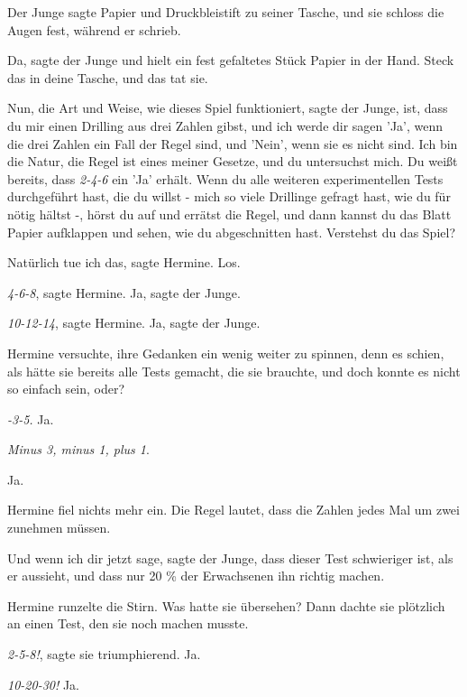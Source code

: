 Der Junge sagte \glqq Papier\grqq{} und \glqq Druckbleistift\grqq{} zu seiner
Tasche, und sie schloss die Augen fest, während er schrieb.

\glqq Da\grqq{}, sagte der Junge und hielt ein fest gefaltetes Stück Papier in
der Hand. \glqq Steck das in deine Tasche\grqq{}, und das tat sie.

\glqq Nun, die Art und Weise, wie dieses Spiel funktioniert\grqq{}, sagte der
Junge, \glqq ist, dass du mir einen Drilling aus drei Zahlen gibst, und ich
werde dir sagen 'Ja', wenn die drei Zahlen ein Fall der Regel sind, und 'Nein',
wenn sie es nicht sind. Ich bin die Natur, die Regel ist eines meiner Gesetze,
und du untersuchst mich. Du weißt bereits, dass \emph{2-4-6} ein 'Ja' erhält.
Wenn du alle weiteren experimentellen Tests durchgeführt hast, die du willst -
mich so viele Drillinge gefragt hast, wie du für nötig hältst -, hörst du auf
und errätst die Regel, und dann kannst du das Blatt Papier aufklappen und sehen,
wie du abgeschnitten hast. Verstehst du das Spiel?\grqq{}

\glqq Natürlich tue ich das\grqq{}, sagte Hermine. \glqq Los.\grqq{}

\glqq \emph{4-6-8}\grqq{}, sagte Hermine. \glqq Ja\grqq{}, sagte der Junge.

\glqq \emph{10-12-14}\grqq{}, sagte Hermine. \glqq Ja\grqq{}, sagte der Junge.

Hermine versuchte, ihre Gedanken ein wenig weiter zu spinnen, denn es schien,
als hätte sie bereits alle Tests gemacht, die sie brauchte, und doch konnte es
nicht so einfach sein, oder?

\emph{-3-5.}\grqq{} \glqq Ja.\grqq{}

\glqq \emph{Minus 3, minus 1, plus 1}.\grqq{}

\glqq Ja.\grqq{}

Hermine fiel nichts mehr ein. \glqq Die Regel lautet, dass die Zahlen jedes Mal
um zwei zunehmen müssen.\grqq{}

\glqq Und wenn ich dir jetzt sage\grqq{}, sagte der Junge, \glqq dass dieser
Test schwieriger ist, als er aussieht, und dass nur 20 \% der Erwachsenen ihn
richtig machen.\grqq{}

Hermine runzelte die Stirn. Was hatte sie übersehen? Dann dachte sie plötzlich
an einen Test, den sie noch machen musste.

\glqq \emph{2-5-8!\grqq{}}, sagte sie triumphierend. \glqq Ja.\grqq{}

\glqq \emph{10-20-30!}\grqq{} \glqq Ja.\grqq{}

